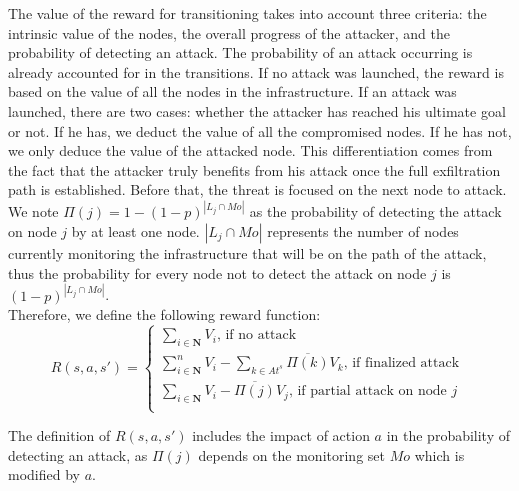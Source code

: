 The value of the reward for transitioning takes into account three criteria: the intrinsic value of the nodes, the overall progress of the attacker, and the probability of detecting an attack. The probability of an attack occurring is already accounted for in the transitions.
If no attack was launched, the reward is based on the value of all the nodes in the infrastructure. 
If an attack was launched, there are two cases: whether the attacker has reached his ultimate goal or not.
If he has, we deduct the value of all the compromised nodes. If he has not, we only deduce the value of the attacked node.
This differentiation comes from the fact that the attacker truly benefits from his attack once the full exfiltration path is established. Before that, the threat is focused on the next node to attack.
\\We note $\Pi(j)=1 - (1-p)^{|L_j \cap Mo|}$ as the probability of detecting the attack on node $j$ by at least one node. $|L_j \cap Mo|$ represents the number of nodes currently monitoring the infrastructure that will be on the path of the attack, thus the probability for every node not to detect the attack on node $j$ is $(1-p)^{|L_j \cap Mo|}$.
\\
Therefore, we define the following reward function: %
\\
\begin{equation}
  R(s,a,s') =\begin{cases}
    \sum\limits_{i\in \textbf{N}} V_i \text{, if no attack}\\
    \sum\limits_{i\in \textbf{N}}^n V_i - \sum\limits_{k \in At^s} \overline{\Pi(k)}V_k \text{, if finalized attack }\\
    \sum\limits_{i\in \textbf{N}} V_i - \overline{\Pi(j)}V_j \text{, if partial attack on node $j$}\\
  \end{cases}
\end{equation}

The definition of $R(s,a,s')$ includes the impact of action $a$ in the probability of detecting an attack, as $\Pi(j)$ depends on the monitoring set $Mo$ which is modified by $a$.